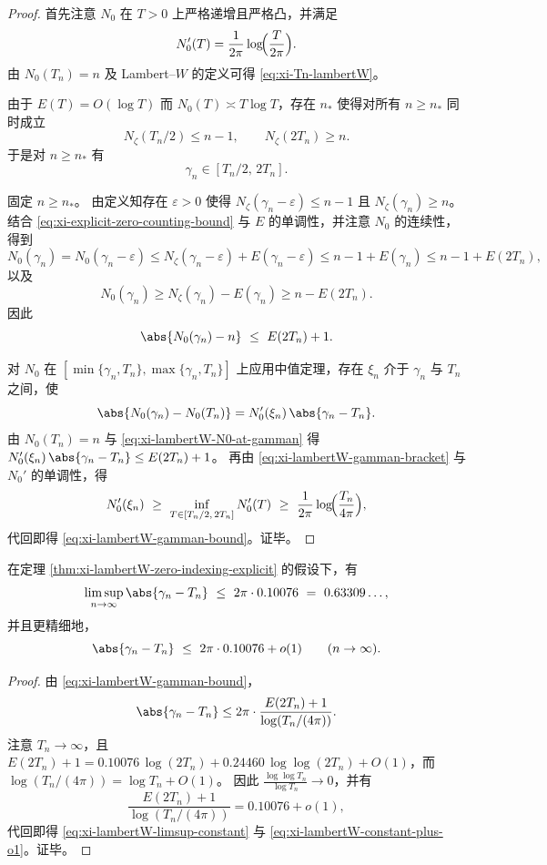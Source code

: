 \begin{proof}
首先注意 \(N_0\) 在 \(T>0\) 上严格递增且严格凸，并满足
\[
N_0'(T)=\frac{1}{2\pi}\log\!\Bigl(\frac{T}{2\pi}\Bigr).
\]
由 \(N_0(T_n)=n\) 及 Lambert--\(W\) 的定义可得 \eqref{eq:xi-Tn-lambertW}。
\par
由于 \(E(T)=O(\log T)\) 而 \(N_0(T)\asymp T\log T\)，存在 \(n_\ast\) 使得对所有 \(n\ge n_\ast\) 同时成立
\[
N_\zeta(T_n/2)\le n-1,
\qquad
N_\zeta(2T_n)\ge n.
\]
于是对 \(n\ge n_\ast\) 有
\begin{equation}\label{eq:xi-lambertW-gamman-bracket}
\gamma_n\in[T_n/2,\,2T_n].
\end{equation}
\par
固定 \(n\ge n_\ast\)。
由定义知存在 \(\varepsilon>0\) 使得 \(N_\zeta(\gamma_n-\varepsilon)\le n-1\) 且 \(N_\zeta(\gamma_n)\ge n\)。
结合 \eqref{eq:xi-explicit-zero-counting-bound} 与 \(E\) 的单调性，并注意 \(N_0\) 的连续性，得到
\[
N_0(\gamma_n)
=N_0(\gamma_n-\varepsilon)
\le N_\zeta(\gamma_n-\varepsilon)+E(\gamma_n-\varepsilon)
\le n-1+E(\gamma_n)
\le n-1+E(2T_n),
\]
以及
\[
N_0(\gamma_n)\ge N_\zeta(\gamma_n)-E(\gamma_n)\ge n-E(2T_n).
\]
因此
\begin{equation}\label{eq:xi-lambertW-N0-at-gamman}
\abs{N_0(\gamma_n)-n}\ \le\ E(2T_n)+1.
\end{equation}
\par
对 \(N_0\) 在 \([\min\{\gamma_n,T_n\},\max\{\gamma_n,T_n\}]\) 上应用中值定理，存在 \(\xi_n\) 介于 \(\gamma_n\) 与 \(T_n\) 之间，使
\[
\abs{N_0(\gamma_n)-N_0(T_n)}=N_0'(\xi_n)\,\abs{\gamma_n-T_n}.
\]
由 \(N_0(T_n)=n\) 与 \eqref{eq:xi-lambertW-N0-at-gamman} 得
\(
N_0'(\xi_n)\,\abs{\gamma_n-T_n}\le E(2T_n)+1
\)。
再由 \eqref{eq:xi-lambertW-gamman-bracket} 与 \(N_0'\) 的单调性，得
\[
N_0'(\xi_n)\ \ge\ \inf_{T\in[T_n/2,\,2T_n]}N_0'(T)
\ \ge\ \frac{1}{2\pi}\log\!\Bigl(\frac{T_n}{4\pi}\Bigr),
\]
代回即得 \eqref{eq:xi-lambertW-gamman-bound}。证毕。
\end{proof}

\begin{corollary}[常数级绝对误差上界的极限常数]\label{cor:xi-lambertW-constant-limsup}
在定理 \ref{thm:xi-lambertW-zero-indexing-explicit} 的假设下，有
\begin{equation}\label{eq:xi-lambertW-limsup-constant}
\limsup_{n\to\infty}\abs{\gamma_n-T_n}\ \le\ 2\pi\cdot 0.10076\ =\ 0.63309\ldots,
\end{equation}
并且更精细地，
\begin{equation}\label{eq:xi-lambertW-constant-plus-o1}
\abs{\gamma_n-T_n}\ \le\ 2\pi\cdot 0.10076+o(1)\qquad(n\to\infty).
\end{equation}
\end{corollary}
\begin{proof}
由 \eqref{eq:xi-lambertW-gamman-bound}，
\[
\abs{\gamma_n-T_n}
\le
2\pi\cdot \frac{E(2T_n)+1}{\log(T_n/(4\pi))}.
\]
注意 \(T_n\to\infty\)，且
\(
E(2T_n)+1
=0.10076\,\log(2T_n)+0.24460\,\log\log(2T_n)+O(1)
\)，而 \(\log(T_n/(4\pi))=\log T_n+O(1)\)。
因此 \(\frac{\log\log T_n}{\log T_n}\to 0\)，并有
\[
\frac{E(2T_n)+1}{\log(T_n/(4\pi))}=0.10076+o(1),
\]
代回即得 \eqref{eq:xi-lambertW-limsup-constant} 与 \eqref{eq:xi-lambertW-constant-plus-o1}。证毕。
\end{proof}

